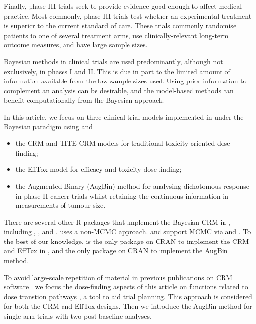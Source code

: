 \documentclass[article]{jss}
\providecommand{\tightlist}{%
  \setlength{\itemsep}{0pt}\setlength{\parskip}{0pt}}
\begin{document}
Finally, phase III trials seek to provide evidence good enough to affect
medical practice. Most commonly, phase III trials test whether an
experimental treatment is superior to the current standard of care.
These trials commonly randomise patients to one of several treatment
arms, use clinically-relevant long-term outcome measures, and have large
sample sizes.

Bayesian methods in clinical trials are used predominantly, although not
exclusively, in phases I and II. This is due in part to the limited
amount of information available from the low sample sizes used. Using
prior information to complement an analysis can be desirable, and the
model-based methods can benefit computationally from the Bayesian
approach.

In this article, we focus on three clinical trial models implemented in
 under the Bayesian paradigm using  and
:

\begin{itemize}
\tightlist
\item
  the CRM and TITE-CRM models for traditional toxicity-oriented
  dose-finding;
\item
  the EffTox model for efficacy and toxicity dose-finding;
\item
  the Augmented Binary (AugBin) method \citep{Wason2013} for analysing
  dichotomous response in phase II cancer trials whilst retaining the
  continuous information in measurements of tumour size.
\end{itemize}

There are several other R-packages that implement the Bayesian CRM in
, including  \citep{dfcrm, Cheung2011},
 \citep{bcrm}, and  \citep{crmPack}. 
uses a non-MCMC approach.  and  support MCMC via
 and . To the best of our knowledge,
 is the only package on CRAN to implement the CRM and EffTox
in , and the only package on CRAN to implement the AugBin
method.

To avoid large-scale repetition of material in previous publications on
CRM software \citep{bcrm, Cheung2011}, we focus the dose-finding aspects
of this article on functions related to dose transtion pathways
\citep{Yap2017, Brock2017a}, a tool to aid trial planning. This approach
is considered for both the CRM and EffTox designs. Then we introduce the
AugBin method for single arm trials with two post-baseline analyses.
\end{document}
